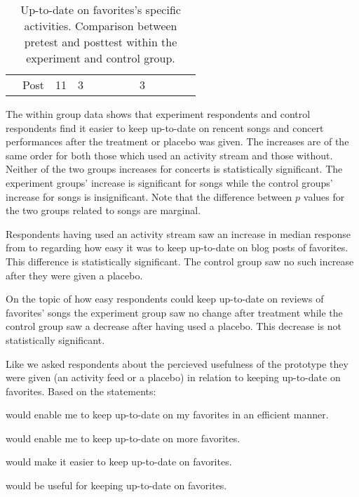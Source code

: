 \begin{table}
\begin{whole}
\begin{tabular}{rrrrccclrrrrl}
        &
        Post &
        11 &
        3 &
        &
        &
        &
        &
        3 \\

  \end{tabular}
  \caption[Up-to-date on Favorites' Specific Activities, Within Groups]{%
    Up-to-date on favorites's specific activities. Comparison between
    pretest and posttest within the experiment and control group.
  }
  \label{table:uptodate.favorite.specific.activities.within}
  \end{whole}
\end{table}

The within group data shows that experiment respondents and control
respondents find it easier to keep up-to-date on rencent songs
and concert performances after the treatment or placebo was given.
The increases are of the same order for both those which used an
activity stream and those without. Neither of the two groups increases
for concerts is statistically significant.
The experiment groups' increase is significant for songs while the control
groups' increase for songs is insignificant.
Note that the difference between $p$ values for the two groups related to
songs are marginal.

Respondents having used an activity stream saw an increase in median
response from  to  regarding
how easy it was to keep up-to-date on blog posts of favorites.
This difference is statistically significant.
The control group saw no such increase after they were given a placebo.

On the topic of how easy respondents could keep up-to-date on
reviews of favorites' songs the experiment group saw no change
after treatment while the control group saw a decrease after having used
a placebo. This decrease is not statistically significant.

\parabreak

Like \citet{davis89} we asked respondents about the percieved usefulness
of the prototype they were given (an activity feed or a placebo) in relation
to keeping up-to-date on favorites. Based on the statements:

\begin{items}
  \item \latest{} would enable me to keep up-to-date on my favorites in an
    efficient manner.
  \item \latest{} would enable me to keep up-to-date on more favorites.
  \item \latest{} would make it easier to keep up-to-date on favorites.
  \item \latest{} would be useful for keeping up-to-date on favorites.
\end{items}

